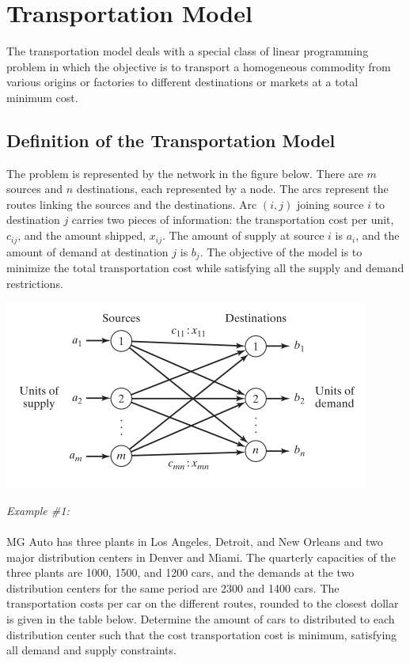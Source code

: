 \section{Transportation Model}
The transportation model deals with a special class of linear programming problem in which the objective is to transport a homogeneous commodity from various origins or factories to different destinations or markets at a total minimum cost.
%
\subsection{Definition of the Transportation Model}
The problem is represented by the network in the figure below. There are $ m $ sources and $ n $ destinations, each represented by a node. The arcs represent the routes linking the sources and the destinations. Arc $ (i, j) $ joining source $ i $ to destination $ j $ carries two pieces of information: the transportation cost per unit, $ c_{ij} $, and the amount shipped, $ x_{ij} $. The amount of supply at source $ i $ is $ a_i $, and the amount of demand at destination $ j $ is $ b_j $. The objective of the model is to minimize the total transportation cost while satisfying all the supply and demand restrictions.
\begin{center}
	\includegraphics{gfx/fig53.png}
\end{center}
\textit{Example \#1:}\\\\
MG Auto has three plants in Los Angeles, Detroit, and New Orleans and two major distribution centers in Denver and Miami. The quarterly capacities of the three plants are 1000, 1500, and 1200 cars, and the demands at the two distribution centers for the same period are 2300 and 1400 cars. The transportation costs per car on the different routes, rounded to the closest dollar is given in the table below. Determine the amount of cars to distributed to each distribution center such that the cost transportation cost is minimum, satisfying all demand and supply constraints.
